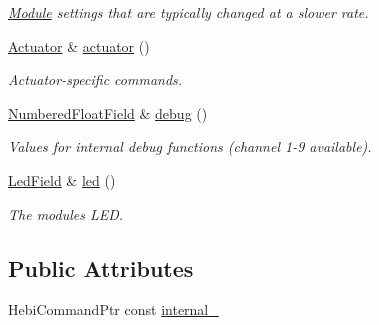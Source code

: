 \begin{DoxyCompactItemize}
\begin{DoxyCompactList}\small\item\em \hyperlink{classhebi_1_1Module}{Module} settings that are typically changed at a slower rate. \end{DoxyCompactList}\item 
\hyperlink{classhebi_1_1Command_1_1Actuator}{Actuator} \& \hyperlink{classhebi_1_1Command_a191430c1056e6cd4566b214342c9c725}{actuator} ()\hypertarget{classhebi_1_1Command_a191430c1056e6cd4566b214342c9c725}{}\label{classhebi_1_1Command_a191430c1056e6cd4566b214342c9c725}

\begin{DoxyCompactList}\small\item\em Actuator-\/specific commands. \end{DoxyCompactList}\item 
\hyperlink{classhebi_1_1Command_1_1NumberedFloatField}{Numbered\+Float\+Field} \& \hyperlink{classhebi_1_1Command_acbb82c0e3d1d1178abae0ce17e5cb058}{debug} ()\hypertarget{classhebi_1_1Command_acbb82c0e3d1d1178abae0ce17e5cb058}{}\label{classhebi_1_1Command_acbb82c0e3d1d1178abae0ce17e5cb058}

\begin{DoxyCompactList}\small\item\em Values for internal debug functions (channel 1-\/9 available). \end{DoxyCompactList}\item 
\hyperlink{classhebi_1_1Command_1_1LedField}{Led\+Field} \& \hyperlink{classhebi_1_1Command_ab39389e955b0d9e5a59091fb1db26eeb}{led} ()\hypertarget{classhebi_1_1Command_ab39389e955b0d9e5a59091fb1db26eeb}{}\label{classhebi_1_1Command_ab39389e955b0d9e5a59091fb1db26eeb}

\begin{DoxyCompactList}\small\item\em The module\textquotesingle{}s L\+ED. \end{DoxyCompactList}\end{DoxyCompactItemize}
\subsection*{Public Attributes}
\begin{DoxyCompactItemize}
\item 
Hebi\+Command\+Ptr const \hyperlink{classhebi_1_1Command_a54791e7ac42129f12d1525df809f3aae}{internal\+\_\+}
\end{DoxyCompactItemize}


